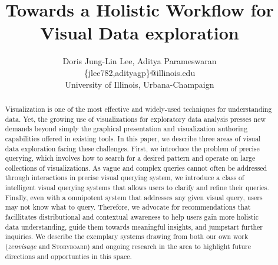 \documentclass[11pt]{article}
\def\plainauthor{Doris Jung-Lin Lee, Aditya Parameswaran}
\newcommand{\zv}{\textit{zenvisage}\xspace}
\newcommand{\sbd}{\textsc{Storyboard}\xspace}
\begin{document}
\title{Towards a Holistic Workflow for Visual Data exploration}
\author{\plainauthor\\
\{jlee782,adityagp\}@illinois.edu\\
University of Illinois, Urbana-Champaign}
\maketitle
\begin{abstract}
Visualization is one of the most effective and widely-used techniques for understanding data. Yet, the growing use of visualizations for exploratory data analysis presses new demands beyond simply the graphical presentation and visualization authoring capabilities offered in existing tools. In this paper, we describe three areas of visual data exploration facing these challenges. First, we introduce the problem of precise querying, which involves how to search for a desired pattern and operate on large collections of visualizations. As vague and complex queries cannot often be addressed through interactions in precise visual querying system, we introduce a class of intelligent visual querying systems that allows users to clarify and refine their queries. Finally, even with a omnipotent system that addresses any given visual query, users may not know what to query. Therefore, we advocate for recommendations that facillitates distributional and contextual awareness to help users gain more holistic data understanding, guide them towards meaningful insights, and jumpstart further inquiries. We describe the exemplary systems drawing from both our own work (\zv and \sbd) and ongoing research in the area to highlight future directions and opportunties in this space.

\end{abstract}








{\footnotesize 
}
\end{document}
